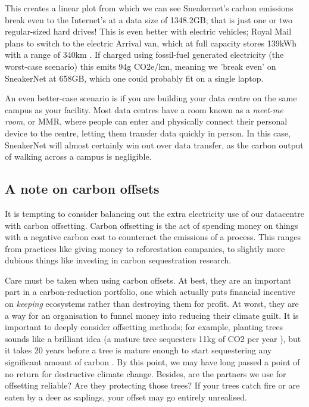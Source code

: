 \documentclass{article}
\begin{document}
This creates a linear plot from which we can see Sneakernet's carbon emissions break even to the Internet's at a data size of 1348.2GB; that is just one or two regular-sized hard drives! This is even better with electric vehicles; Royal Mail plans to switch to the electric Arrival van, which at full capacity stores 139kWh with a range of 340km \citep{hubbard2021new}. If charged using fossil-fuel generated electricity (the worst-case scenario) this emits 94g CO2e/km, meaning we 'break even' on SneakerNet at 658GB, which one could probably fit on a single laptop. \newline

An even better-case scenario is if you are building your data centre on the same campus as your facility. Most data centres have a room known as a \emph{meet-me room}, or MMR, where people can enter and physically connect their personal device to the centre, letting them transfer data quickly in person. In this case, SneakerNet will almost certainly win out over data transfer, as the carbon output of walking across a campus is negligible. \newline


\subsection{A note on carbon offsets}
It is tempting to consider balancing out the extra electricity use of our datacentre with carbon offsetting. Carbon offsetting is the act of spending money on things with a negative carbon cost to counteract the emissions of a process. This ranges from practices like giving money to reforestation companies, to slightly more dubious things like investing in carbon sequestration research. \newline

Care must be taken when using carbon offsets. At best, they are an important part in a carbon-reduction portfolio, one which actually puts financial incentive on \emph{keeping} ecosystems rather than destroying them for profit. At worst, they are a way for an organisation to funnel money into reducing their climate guilt. It is important to deeply consider offsetting methods; for example, planting trees sounds like a brilliant idea (a mature tree sequesters 11kg of CO2 per year \citep{akbari2002shade}), but it takes 20 years before a tree is mature enough to start sequestering any significant amount of carbon \citep{ghussain2020biggest}. By this point, we may have long passed a point of no return for destructive climate change. Besides, are the partners we use for offsetting reliable? Are they protecting those trees? If your trees catch fire or are eaten by a deer as saplings, your offset may go entirely unrealised. \newline
\end{document}
